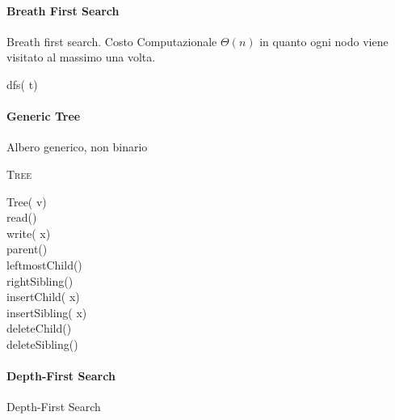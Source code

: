 \documentclass[../../notes.tex]{subfiles}
\begin{document}
  \paragraph{Breath First Search} Breath first search. Costo Computazionale $\Theta(n)$ in quanto ogni nodo viene visitato al massimo una volta.

  \begin{algorithm}[H]
    \NoCaptionOfAlgo
    \caption{dfs( t)}

  \end{algorithm}

  \paragraph{Generic Tree} Albero generico, non binario

  \begin{algorithm}[H]
    \NoCaptionOfAlgo
    \caption{\textsc{Tree}}

    Tree( v)\\
     read()\\
    write( x)\\
     parent()\\
     leftmostChild()\\
     rightSibling()\\

    insertChild( x)\\
    insertSibling( x)\\

    deleteChild()\\
    deleteSibling()\\
  \end{algorithm}


  \paragraph{Depth-First Search} Depth-First Search
\end{document}
